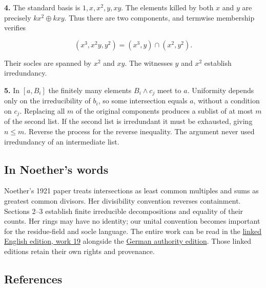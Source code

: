 \documentclass[
]{article}
\begin{document}
\textbf{4.} The standard basis is \(1,x,x^2,y,xy\). The elements killed
by both \(x\) and \(y\) are precisely \(kx^2\oplus kxy\). Thus there are
two components, and termwise membership verifies

\[
(x^3,x^2y,y^2)=(x^3,y)\cap(x^2,y^2).
\]

Their socles are spanned by \(x^2\) and \(xy\). The witnesses \(y\) and
\(x^2\) establish irredundancy.

\textbf{5.} In \([a,B_i]\) the finitely many elements \(B_i\wedge c_j\)
meet to \(a\). Uniformity depends only on the irreducibility of \(b_i\),
so some intersection equals \(a\), without a condition on \(c_j\).
Replacing all \(m\) of the original components produces a sublist of at
most \(m\) of the second list. If the second list is irredundant it must
be exhausted, giving \(n\le m\). Reverse the process for the reverse
inequality. The argument never used irredundancy of an intermediate
list.

\subsection{In Noether's words}\label{in-noethers-words}

Noether's 1921 paper treats intersections as least common multiples and
sums as greatest common divisors. Her divisibility convention reverses
containment. Sections 2--3 establish finite irreducible decompositions
and equality of their counts. Her rings may have no identity; our unital
convention becomes important for the residue-field and socle language.
The entire work can be read in the
\href{https://github.com/KokunoYumeto/emmy-noether-en/blob/main/source/Noether_English_ED0014.tex}{linked
English edition, work 19} alongside the
\href{https://doi.org/10.5281/zenodo.21908301}{German authority
edition}. Those linked editions retain their own rights and provenance.

\subsection{References}\label{references}
\end{document}
